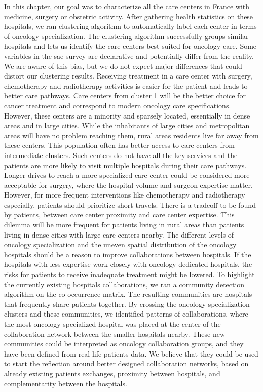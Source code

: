In this chapter, our goal was to characterize all the care centers in France
with medicine, surgery or obstetric activity. After gathering health statistics
on these hospitals, we ran clustering algorithm to automatically label each
center in terms of oncology specialization. The clustering algorithm
successfully groups similar hospitals and lets us identify the care centers best
suited for oncology care. Some variables in the \ac{sae} survey are declarative
and potentially differ from the reality. We are aware of this bias, but we do
not expect major differences that could distort our clustering results.
Receiving treatment in a care center with surgery, chemotherapy and radiotherapy
activities is easier for the patient and leads to better care pathways. Care
centers from cluster 1 will be the better choice for cancer treatment and
correspond to modern oncology care specifications. However, these centers are a
minority and sparsely located, essentially in dense areas and in large cities.
While the inhabitants of large cities and metropolitan areas will have no
problem reaching them, rural areas residents live far away from these centers.
This population often has better access to care centers from intermediate
clusters. Such centers do not have all the key services and the patients are
more likely to visit multiple hospitals during their care pathways. Longer
drives to reach a more specialized care center could be considered more
acceptable for surgery, where the hospital volume and surgeon expertise matter.
However, for more frequent interventions like chemotherapy and radiotherapy
especially, patients should prioritize short travels. There is a tradeoff to be
found by patients, between care center proximity and care center expertise. This
dilemma will be more frequent for patients living in rural areas than patients
living in dense cities with large care centers nearby. The different levels of
oncology specialization and the uneven spatial distribution of the oncology
hospitals should be a reason to improve collaborations between hospitals.
If the hospitals with less expertise work closely with oncology dedicated
hospitals, the risks for patients to receive inadequate treatment might be
lowered. To highlight the currently existing hospitals collaborations, we
ran a community detection algorithm on the co-occurrence matrix. The resulting
communities are hospitals that frequently share patients together. By crossing
the oncology specialization clusters and these communities, we identified
patterns of collaborations, where the most oncology specialized hospital was
placed at the center of the collaboration network between the smaller
hospitals nearby. These new communities could be interpreted as oncology
collaboration groups, and they have been defined from real-life patients data.
We believe that they could be used to start the reflection around better
designed collaboration networks, based on already existing patients exchanges,
proximity between hospitals, and complementarity between the hospitals.
